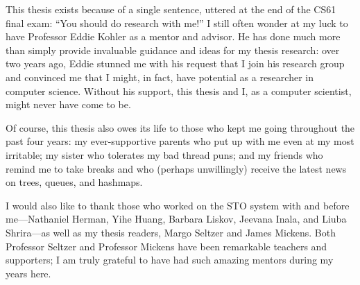 This thesis exists because of a single sentence, uttered at the end of the CS61 final exam: ``You should do research with me!'' I still often wonder at my luck to have Professor Eddie Kohler as a mentor and advisor. He has done much more than simply provide invaluable guidance and ideas for my thesis research: over two years ago, Eddie stunned me with his request that I join his research group and convinced me that I might, in fact, have potential as a researcher in computer science. Without his support, this thesis and I, as a computer scientist, might never have come to be.

    Of course, this thesis also owes its life to those who kept me going throughout the past four years: my ever-supportive parents who put up with me even at my most irritable; my sister who tolerates my bad thread puns; and my friends who remind me to take breaks and who (perhaps unwillingly) receive the latest news on trees, queues, and hashmaps.

        I would also like to thank those who worked on the STO system with and before me---Nathaniel Herman, Yihe Huang, Barbara Liskov, Jeevana Inala, and Liuba Shrira---as well as my thesis readers, Margo Seltzer and James Mickens. Both Professor Seltzer and Professor Mickens have been remarkable teachers and supporters; I am truly grateful to have had such amazing mentors during my years here.

